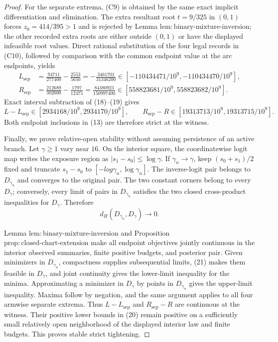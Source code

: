 \documentclass{article}
\begin{document}
\begin{proof}
For the separate extrema, (C9) is obtained by the same exact implicit differentiation and elimination.  The extra resultant root \(t=9/325\) in \((0,1)\) forces \(z_0=414/395>1\) and is rejected by Lemma \(\mathrm{lem{:}binary\text{-}mixture\text{-}inversion}\); the other recorded extra roots are either outside \((0,1)\) or have the displayed infeasible root values.  Direct rational substitution of the four legal records in (C10), followed by comparison with the common endpoint value at the arc endpoints, yields
\[
\begin{aligned}
 L_{\mathrm{sep}}
 &=\frac{94711}{277400}-\frac{2553}{5650}
 =-\frac{3461701}{31346200}
 \in[-110434471/10^9,-110434470/10^9],\\
 R_{\mathrm{sep}}
 &=\frac{212689}{302600}-\frac{1797}{12475}
 =\frac{84380923}{150997400}
 \in[558823681/10^9,558823682/10^9].
\end{aligned}                                                           \tag{19}
\]
Exact interval subtraction of (18)--(19) gives
\[
 L-L_{\mathrm{sep}}
 \in[2934168/10^9,2934170/10^9],
 \qquad
 R_{\mathrm{sep}}-R
 \in[19313713/10^9,19313715/10^9].                                     \tag{20}
\]
Both endpoint inclusions in (13) are therefore strict at the witness.

Finally, we prove relative-open stability without assuming persistence of an active branch.  Let \(\gamma\geq1\) vary near \(16\).  On the interior square, the coordinatewise logit map writes the exposure region as \(|s_1-s_0|\leq\log\gamma\).  If \(\gamma_n\to\gamma\), keep \((s_0+s_1)/2\) fixed and truncate \(s_1-s_0\) to \([-log\gamma_n,\log\gamma_n]\).  The inverse-logit pair belongs to \(D_{\gamma_n}\) and converges to the original pair.  The two constant corners belong to every \(D_\gamma\); conversely, every limit of pairs in \(D_{\gamma_n}\) satisfies the two closed cross-product inequalities for \(D_\gamma\).  Therefore
\[
 d_H(D_{\gamma_n},D_\gamma)\longrightarrow0.                           \tag{21}
\]

Lemma \(\mathrm{lem{:}binary\text{-}mixture\text{-}inversion}\) and Proposition \(\mathrm{prop{:}closed\text{-}chart\text{-}extension}\) make all endpoint objectives jointly continuous in the interior observed summaries, finite positive budgets, and posterior pair.  Given minimizers in \(D_{\gamma_n}\), compactness supplies subsequential limits, (21) makes them feasible in \(D_\gamma\), and joint continuity gives the lower-limit inequality for the minima.  Approximating a minimizer in \(D_\gamma\) by points in \(D_{\gamma_n}\) gives the upper-limit inequality.  Maxima follow by negation, and the same argument applies to all four armwise separate extrema.  Thus \(L-L_{\mathrm{sep}}\) and \(R_{\mathrm{sep}}-R\) are continuous at the witness.  Their positive lower bounds in (20) remain positive on a sufficiently small relatively open neighborhood of the displayed interior law and finite budgets.  This proves stable strict tightening.
\end{proof}
\end{document}
